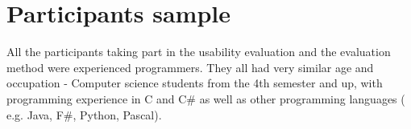 \section{Participants sample}

All the participants taking part in the usability evaluation and the evaluation method were experienced programmers. They all had very similar age and occupation - Computer science students from the 4th semester and up, with programming experience in C and C\# as well as other programming languages ( e.g. Java, F\#, Python, Pascal). 

